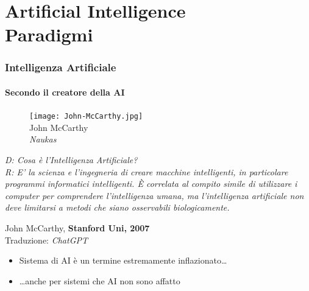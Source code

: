 \section{Artificial Intelligence\\{\small Paradigmi}} %
\label{sec:ai_paradigms}
%
\begin{frame}[t,fragile] \frametitle{Intelligenza Artificiale}
{\scriptsize
	\onslide<1->
		\framesubtitle{Secondo il creatore della AI}
		\vspace*{3pt}
		\begin{minipage}[t]{\textwidth}
			\begin{minipage}[t]{0.45\textwidth}
				\centering
				\begin{figure}[ht]
					\texttt{[image: John-McCarthy.jpg]}
					{\tiny\\John McCarthy\\\vspace*{-1pt}\textit{\textcopyright Naukas}}
				\end{figure}
			\end{minipage}
		    \begin{minipage}[t]{0.5\textwidth}
				\renewcommand{\epigraphsize}{\small}
				\setlength{\afterepigraphskip}{0pt}
				\setlength{\beforeepigraphskip}{5pt}
				\setlength{\epigraphwidth}{\textwidth}
				\epigraph{
					\textit{\alert{D:} Cosa è l'Intelligenza Artificiale?\\
					\alert{R:} E' la scienza e l'ingegneria di creare macchine intelligenti, in particolare programmi informatici intelligenti. È correlata al compito simile di utilizzare i computer per comprendere l'intelligenza umana, \alert{ma l'intelligenza artificiale non deve limitarsi a metodi che siano osservabili biologicamente}.}}{John McCarthy, \textbf{Stanford Uni, 2007}\\Traduzione: \textit{\textcopyright ChatGPT}}
			\end{minipage}
		\end{minipage}
}
	\begin{itemize}[leftmargin=10pt,align=right]
		\item[\alert{\faArrowCircleRight}] Sistema di AI è un termine estremamente inflazionato\ldots 
		\onslide<3->\item[\alert{\faArrowCircleRight}] \ldots anche per sistemi che AI non sono affatto
	\end{itemize}
\end{frame}
%
